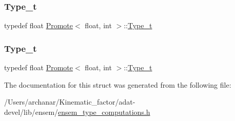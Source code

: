 \subsubsection{\texorpdfstring{Type\_t}{Type\_t}\hspace{0.1cm}{\footnotesize\ttfamily [2/3]}}
{\footnotesize\ttfamily typedef float \mbox{\hyperlink{structPromote}{Promote}}$<$ float, int $>$\+::\mbox{\hyperlink{structPromote_3_01float_00_01int_01_4_a8df52b198586e88fc51366c1f8774543}{Type\+\_\+t}}}

\mbox{\label{structPromote_3_01float_00_01int_01_4_a8df52b198586e88fc51366c1f8774543}} 
\subsubsection{\texorpdfstring{Type\_t}{Type\_t}\hspace{0.1cm}{\footnotesize\ttfamily [3/3]}}
{\footnotesize\ttfamily typedef float \mbox{\hyperlink{structPromote}{Promote}}$<$ float, int $>$\+::\mbox{\hyperlink{structPromote_3_01float_00_01int_01_4_a8df52b198586e88fc51366c1f8774543}{Type\+\_\+t}}}



The documentation for this struct was generated from the following file\+:\begin{DoxyCompactItemize}
\item 
/\+Users/archanar/\+Kinematic\+\_\+factor/adat-\/devel/lib/ensem/\mbox{\hyperlink{adat-devel_2lib_2ensem_2ensem__type__computations_8h}{ensem\+\_\+type\+\_\+computations.\+h}}\end{DoxyCompactItemize}
